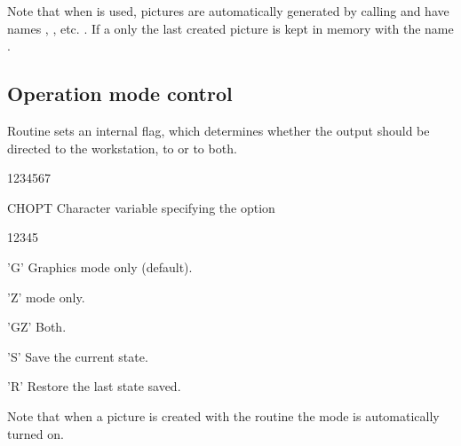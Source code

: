 Note that when \HPLOT{} is used, pictures are
automatically generated by calling 
and have names , , etc. . If a 
 only the last created picture is 
kept in memory with the name .
\subsection{Operation mode control}
\Action
Routine 
 sets an internal flag, which determines whether the \HIGZ{}
output should be directed to the workstation, to \ZEBRA{} or to both.
\Pdesc
\begin{DLtt}{1234567}
\item[CHOPT] Character variable specifying the option
\begin{DLtt}{12345}
\item['G'] Graphics mode only (default).
\item['Z'] \ZEBRA{} mode only.
\item['GZ'] Both.
\item['S'] Save the current state.
\item['R'] Restore the last state saved.
\end{DLtt}
\end{DLtt}
Note that when a picture is created with the routine  the
 mode is automatically turned on.

